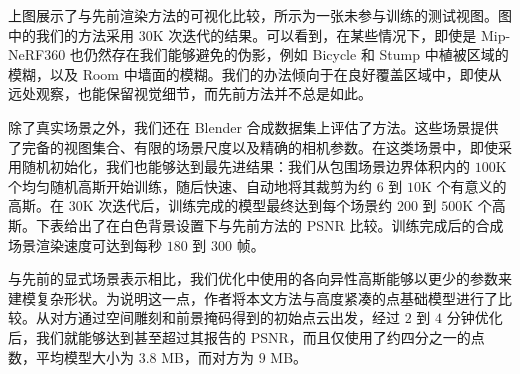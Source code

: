 上图展示了与先前渲染方法的可视化比较，所示为一张未参与训练的测试视图。图中的我们的方法采用 \(30\mathrm{K}\) 次迭代的结果。可以看到，在某些情况下，即使是 Mip-NeRF360 也仍然存在我们能够避免的伪影，例如 Bicycle 和 Stump 中植被区域的模糊，以及 Room 中墙面的模糊。我们的办法倾向于在良好覆盖区域中，即使从远处观察，也能保留视觉细节，而先前方法并不总是如此。

除了真实场景之外，我们还在 Blender 合成数据集上评估了方法。这些场景提供了完备的视图集合、有限的场景尺度以及精确的相机参数。在这类场景中，即使采用随机初始化，我们也能够达到最先进结果：我们从包围场景边界体积内的 \(100\mathrm{K}\) 个均匀随机高斯开始训练，随后快速、自动地将其裁剪为约 \(6\) 到 \(10\mathrm{K}\) 个有意义的高斯。在 \(30\mathrm{K}\) 次迭代后，训练完成的模型最终达到每个场景约 \(200\) 到 \(500\mathrm{K}\) 个高斯。下表给出了在白色背景设置下与先前方法的 PSNR 比较。训练完成后的合成场景渲染速度可达到每秒 \(180\) 到 \(300\) 帧。

\begin{table}[H]
    \centering
    \caption{Synthetic NeRF 数据集上的 PSNR 分数。我们从 \(100\mathrm{K}\) 个随机初始化点开始，比较方法的数值取自各自原论文。}
    \label{tab:3dgs-syn-psnr}
    \scriptsize
\end{table}

与先前的显式场景表示相比，我们优化中使用的各向异性高斯能够以更少的参数来建模复杂形状。为说明这一点，作者将本文方法与高度紧凑的点基础模型进行了比较。从对方通过空间雕刻和前景掩码得到的初始点云出发，经过 \(2\) 到 \(4\) 分钟优化后，我们就能够达到甚至超过其报告的 PSNR，而且仅使用了约四分之一的点数，平均模型大小为 \(3.8\) MB，而对方为 \(9\) MB。

